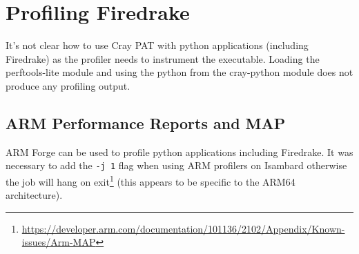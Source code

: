 \documentclass[a4paper,titlepage]{article}
\begin{document}

\section{Profiling Firedrake}
\label{section:profiling_firedrake}

It's not clear how to use Cray PAT with python applications (including Firedrake) as the profiler needs to instrument the executable. Loading the perftools-lite module and using the python from the cray-python module does not produce any profiling output.


\subsection{ARM Performance Reports and MAP}

ARM Forge can be used to profile python applications including Firedrake. It was necessary to add the \verb+-j 1+ flag when using ARM profilers on Isambard otherwise the job will hang on exit\footnote{\url{https://developer.arm.com/documentation/101136/2102/Appendix/Known-issues/Arm-MAP}} (this appears to be specific to the ARM64 architecture).
\end{document}
